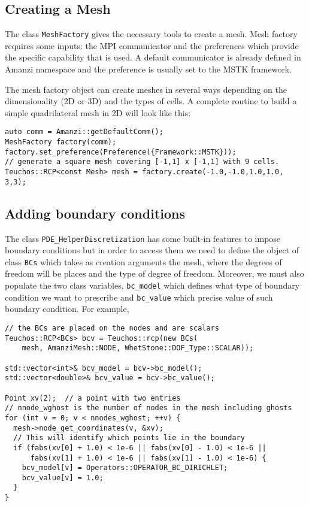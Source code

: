 \subsection{Creating a Mesh}\label{CreatingAMesh}
The class {\tt MeshFactory} gives the necessary tools to create a mesh. 
Mesh factory requires some inputs: the MPI communicator and the preferences which provide the specific capability that is used. 
A default communicator is already defined in Amanzi namespace and the preference is usually set 
to the MSTK framework.

The mesh factory object can create meshes in several ways depending on the dimensionality (2D or 3D) and the types of cells. 
A complete routine to build a simple quadrilateral mesh in 2D will look like this: 
%
\begin{lstlisting}
auto comm = Amanzi::getDefaultComm();
MeshFactory factory(comm);
factory.set_preference(Preference({Framework::MSTK}));
// generate a square mesh covering [-1,1] x [-1,1] with 9 cells.
Teuchos::RCP<const Mesh> mesh = factory.create(-1.0,-1.0,1.0,1.0, 3,3);
\end{lstlisting}


\subsection{Adding boundary conditions}\label{Sec:AddingBoundaryCond}
The class {\tt PDE\_HelperDiscretization} has some built-in features to impose boundary conditions 
but in order to access them we need to define the object of class {\tt BCs} which takes as 
creation arguments the mesh, where the degrees of freedom will be places and the type of degree 
of freedom.
% 
Moreover, we must also populate the two class variables, {\tt bc\_model} which defines what 
type of boundary condition we want to prescribe and {\tt bc\_value} which precise value of such 
boundary condition.
%
For example,
%
\begin{lstlisting}
// the BCs are placed on the nodes and are scalars
Teuchos::RCP<BCs> bcv = Teuchos::rcp(new BCs(
    mesh, AmanziMesh::NODE, WhetStone::DOF_Type::SCALAR));

std::vector<int>& bcv_model = bcv->bc_model();
std::vector<double>& bcv_value = bcv->bc_value();

Point xv(2);  // a point with two entries
// nnode_wghost is the number of nodes in the mesh including ghosts
for (int v = 0; v < nnodes_wghost; ++v) {
  mesh->node_get_coordinates(v, &xv);
  // This will identify which points lie in the boundary
  if (fabs(xv[0] + 1.0) < 1e-6 || fabs(xv[0] - 1.0) < 1e-6 ||
      fabs(xv[1] + 1.0) < 1e-6 || fabs(xv[1] - 1.0) < 1e-6) {
    bcv_model[v] = Operators::OPERATOR_BC_DIRICHLET;
    bcv_value[v] = 1.0;
  }
}
\end{lstlisting}



